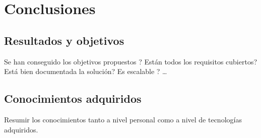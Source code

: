 \chapter{Conclusiones}  \label{conclusiones}
\section{Resultados y objetivos} \label{conclusiones.resultados}
Se han conseguido los objetivos propuestos ? Están todos los requisitos cubiertos? Está bien documentada la solución? Es escalable ? …

\section{Conocimientos adquiridos} \label{conclusiones.conocimientos}
Resumir los conocimientos tanto a nivel personal como a nivel de tecnologías adquiridos.
 

 
